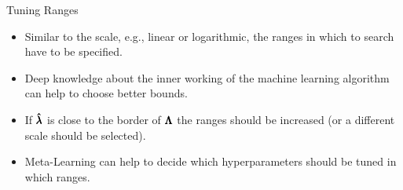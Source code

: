 \begin{frame}[allowframebreaks]{Tuning Ranges}
\begin{figure}[htb]
\end{figure}

\framebreak

    \begin{itemize}
        \item Similar to the scale, e.g., linear or logarithmic, the ranges in which to search have to be specified.
        \item Deep knowledge about the inner working of the machine learning algorithm can help to choose better bounds.
        \item If $\pmb{\hat{\lambda}}$ is close to the border of $\pmb{\Lambda}$ the ranges should be increased (or a different scale should be selected).
        \item Meta-Learning can help to decide which hyperparameters should be tuned in which ranges.
    \end{itemize}

\end{frame}




